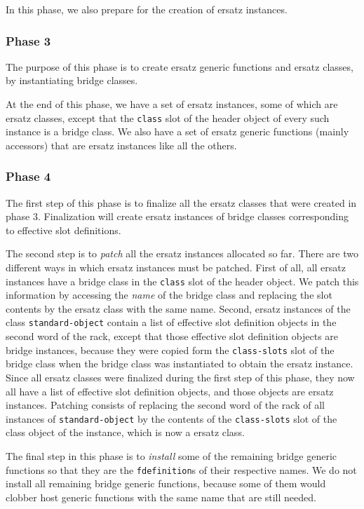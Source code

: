 In this phase, we also prepare for the creation of ersatz instances.

\subsubsection{Phase 3}

The purpose of this phase is to create ersatz generic functions and
ersatz classes, by instantiating bridge classes.  

At the end of this phase, we have a set of ersatz instances, some of
which are ersatz classes, except that the \texttt{class} slot of the
header object of every such instance is a bridge class.  We also have
a set of ersatz generic functions (mainly accessors) that are ersatz
instances like all the others. 

\subsubsection{Phase 4}

The first step of this phase is to finalize all the ersatz classes
that were created in phase 3.  Finalization will create ersatz
instances of bridge classes corresponding to effective slot
definitions. 

The second step is to \emph{patch} all the ersatz instances allocated
so far.  There are two different ways in which ersatz instances must
be patched.  First of all, all ersatz instances have a bridge class in
the \texttt{class} slot of the header object.  We patch this
information by accessing the \emph{name} of the bridge class and
replacing the slot contents by the ersatz class with the same name.
Second, ersatz instances of the class \texttt{standard-object} contain
a list of effective slot definition objects in the second word of the
rack, except that those effective slot definition objects
are bridge instances, because they were copied form the
\texttt{class-slots} slot of the bridge class when the bridge class
was instantiated to obtain the ersatz instance.  Since all ersatz
classes were finalized during the first step of this phase, they now
all have a list of effective slot definition objects, and those
objects are ersatz instances.  Patching consists of replacing the
second word of the rack of all instances of
\texttt{standard-object} by the contents of the \texttt{class-slots}
slot of the class object of the instance, which is now a ersatz
class. 

The final step in this phase is to \emph{install} some of the
remaining bridge generic functions so that they are the
\texttt{fdefinition}s of their respective names.  We do not install
all remaining bridge generic functions, because some of them would
clobber host generic functions with the same name that are still
needed.  

